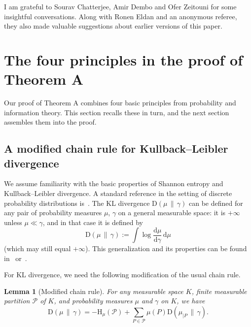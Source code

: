 \documentclass[aop,preprint]{imsart}
\newtheorem{lem}[thm]{Lemma}
\theoremstyle{remark}
\newcommand{\rmH}{\mathrm{H}}
\renewcommand{\d}{\mathrm{d}}
\renewcommand{\P}{\mathcal{P}}
\newcommand{\g}{\gamma}
\newcommand{\rmD}{\mathrm{D}}
\begin{document}
I am grateful to Sourav Chatterjee, Amir Dembo and Ofer Zeitouni for some insightful conversations.  Along with Ronen Eldan and an anonymous referee, they also made valuable suggestions about earlier versions of this paper.

\section{The four principles in the proof of Theorem A}\label{sec:princs}

Our proof of Theorem A combines four basic principles from probability and information theory.  This section recalls these in turn, and the next section assembles them into the proof.


\subsection{A modified chain rule for Kullback--Leibler divergence}\label{subs:chain}

We assume familiarity with the basic properties of Shannon entropy and Kullback--Leibler divergence.  A standard reference in the setting of discrete probability distributions is~\cite[Chapter 2]{CovTho06}.  The KL divergence $\rmD(\mu\,\|\,\g)$ can be defined for any pair of probability measures $\mu$, $\g$ on a general measurable space: it is $+\infty$ unless $\mu \ll \g$, and in that case it is defined by
\[\rmD(\mu\,\|\,\g) := \int \log\frac{\d\mu}{\d\g}\,\d\mu\]
(which may still equal $+\infty$). This generalization and its properties can be found in~\cite[Chapters 2 and 3]{Pin64} or~\cite[Appendix D.3]{DemZei--LDPbook}.

For KL divergence, we need the following modification of the usual chain rule.

\begin{lem}[Modified chain rule]\label{lem:mod-chain}
	For any measurable space $K$, finite measurable partition $\P$ of $K$, and probability measures $\mu$ and $\g$ on $K$, we have
	\begin{equation}\label{eq:mod-chain}
		\rmD(\mu\,\|\,\g) = -\rmH_\mu(\P) + \sum_{P \in \P}\mu(P)\rmD(\mu_{|P}\,\|\,\g).
	\end{equation}
\end{lem}
\end{document}
